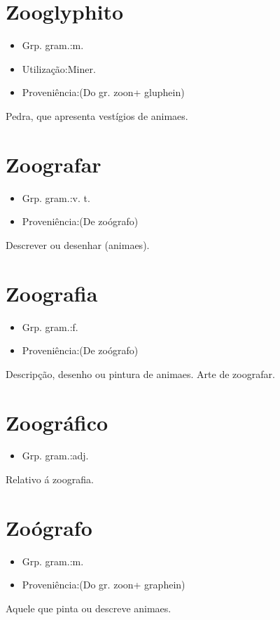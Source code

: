 \section{Zooglyphito}
\begin{itemize}
\item {Grp. gram.:m.}
\end{itemize}
\begin{itemize}
\item {Utilização:Miner.}
\end{itemize}
\begin{itemize}
\item {Proveniência:(Do gr. \textunderscore zoon\textunderscore  + \textunderscore gluphein\textunderscore )}
\end{itemize}
Pedra, que apresenta vestígios de animaes.
\section{Zoografar}
\begin{itemize}
\item {Grp. gram.:v. t.}
\end{itemize}
\begin{itemize}
\item {Proveniência:(De \textunderscore zoógrafo\textunderscore )}
\end{itemize}
Descrever ou desenhar (animaes).
\section{Zoografia}
\begin{itemize}
\item {Grp. gram.:f.}
\end{itemize}
\begin{itemize}
\item {Proveniência:(De \textunderscore zoógrafo\textunderscore )}
\end{itemize}
Descripção, desenho ou pintura de animaes.
Arte de zoografar.
\section{Zoográfico}
\begin{itemize}
\item {Grp. gram.:adj.}
\end{itemize}
Relativo á zoografia.
\section{Zoógrafo}
\begin{itemize}
\item {Grp. gram.:m.}
\end{itemize}
\begin{itemize}
\item {Proveniência:(Do gr. \textunderscore zoon\textunderscore  + \textunderscore graphein\textunderscore )}
\end{itemize}
Aquele que pinta ou descreve animaes.
